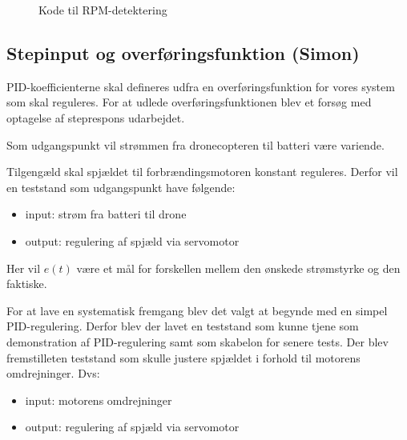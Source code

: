 \begin{figure}[h]
  \centering
    
  \caption{Kode til RPM-detektering}
  \label{fig:kodes3}
\end{figure}


\subsection{Stepinput og overføringsfunktion (Simon)}
\label{sec:tests}

PID-koefficienterne skal defineres udfra en overføringsfunktion for vores system som skal reguleres. For at udlede overføringsfunktionen blev et forsøg med optagelse af steprespons udarbejdet.


Som udgangspunkt vil strømmen fra dronecopteren til batteri være variende.%

Tilgengæld skal spjældet til forbrændingsmotoren konstant reguleres. Derfor vil en teststand som udgangspunkt have følgende:
\begin{itemize}
\item input: strøm fra batteri til drone
\item output: regulering af spjæld via servomotor
\end{itemize}

Her vil $e(t)$ være et mål for forskellen mellem den ønskede strømstyrke og den faktiske.

For at lave en systematisk fremgang blev det valgt at begynde med en simpel PID-regulering. Derfor blev der lavet en teststand som kunne tjene som demonstration af PID-regulering samt som skabelon for senere tests. Der blev fremstilleten teststand som skulle justere spjældet i forhold til motorens omdrejninger. Dvs:

\begin{itemize}
\item input: motorens omdrejninger
\item output: regulering af spjæld via servomotor
\end{itemize}

